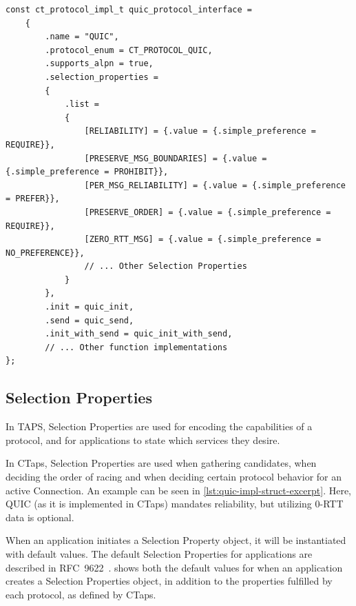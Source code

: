 \begin{listing}[htbp]
  \begin{verbatim}
const ct_protocol_impl_t quic_protocol_interface =
    {
        .name = "QUIC",
        .protocol_enum = CT_PROTOCOL_QUIC,
        .supports_alpn = true,
        .selection_properties =
        {
            .list =
            {
                [RELIABILITY] = {.value = {.simple_preference = REQUIRE}},
                [PRESERVE_MSG_BOUNDARIES] = {.value = {.simple_preference = PROHIBIT}},
                [PER_MSG_RELIABILITY] = {.value = {.simple_preference = PREFER}},
                [PRESERVE_ORDER] = {.value = {.simple_preference = REQUIRE}},
                [ZERO_RTT_MSG] = {.value = {.simple_preference = NO_PREFERENCE}},
                // ... Other Selection Properties
            }
        },
        .init = quic_init,
        .send = quic_send,
        .init_with_send = quic_init_with_send,
        // ... Other function implementations
};
  \end{verbatim}
  \caption[QUIC protocol interface excerpt]{
Excerpt of the QUIC interface struct. The full implementation can
be seen in \cref{lst:quic-impl-struct} in~\cref{app:internal-code-examples}.
}
  \label{lst:quic-impl-struct-excerpt}
\end{listing}

\subsection{Selection Properties} \label{sec:protocol-impl-sel-props}
In TAPS, Selection Properties are used for encoding the capabilities
of a protocol, and for applications to state which services they
desire.

In CTaps, Selection Properties are used when gathering candidates,
when deciding the order of racing and when deciding certain protocol behavior for
an active Connection.
An example can be seen in \cref{lst:quic-impl-struct-excerpt}. Here,
QUIC (as it is implemented in CTaps) mandates reliability,
but utilizing 0-RTT data is optional.

When an application initiates a Selection Property object, it
will be instantiated with default values.
The default Selection Properties for applications are described in
RFC~9622~\cite[sec.~6.2]{rfc9622}.
shows both the default values for when an application creates a Selection Properties
object, in addition to the properties fulfilled by each protocol, as defined by CTaps.

